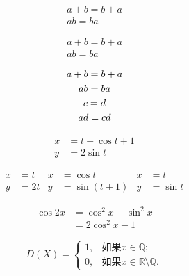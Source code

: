 \documentclass{ctexart}
\begin{document}
	\begin{gather}
		a+b=b+a\\
		ab = ba
	\end{gather}


	\begin{gather*}
	a+b=b+a\\
	ab = ba
	\end{gather*}
	
	\begin{gather}
	a+b=b+a\\
	ab = ba\\
	c = d\\
	ad =cd \notag
	\end{gather}
	
	\begin{align}
		x &= t + \cos t + 1 \\ %
		y &= 2\sin t
	\end{align}
	
	\begin{align*}
		x &= t & x &= \cos t & x &= t\\
		y &= 2t & y&= \sin(t+1) & y &= \sin t
	\end{align*}
	
	\begin{equation} %
		\begin{split}
		\cos 2x &= \cos^2 x - \sin^2 x \\
		&= 2\cos^2 x - 1
		\end{split}
	\end{equation}
	
	
	\begin{equation}
		D(X)=\begin{cases}
		1, & \text{如果} x \in \mathbb{Q};\\
		0, & \text{如果} x \in
		\mathbb{R}\setminus\mathbb{Q}.
		\end{cases}
	\end{equation}
	
\end{document}
